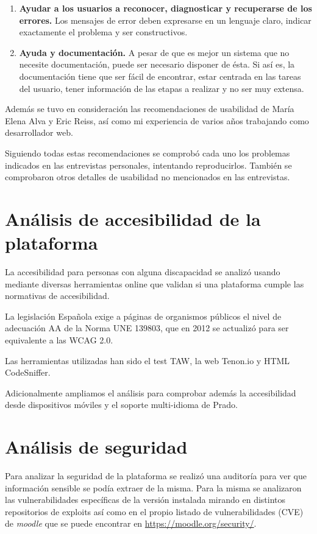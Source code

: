 \begin{enumerate}
\item \textbf{Ayudar a los usuarios a reconocer, diagnosticar y recuperarse de los errores.} Los mensajes de error deben expresarse en un lenguaje claro, indicar exactamente el problema y ser constructivos.
\item \textbf{Ayuda y documentación.} A pesar de que es mejor un sistema que no necesite documentación, puede ser necesario disponer de ésta. Si así es, la documentación tiene que ser fácil de encontrar, estar centrada en las tareas del usuario, tener información de las etapas a realizar y no ser muy extensa.
\end{enumerate}


Además se tuvo en consideración las recomendaciones de usabilidad de María Elena Alva\cite{melenaalva} y Eric Reiss\cite{ericreiss}, así como mi experiencia de varios años trabajando como desarrollador web.

\bigskip
Siguiendo todas estas recomendaciones se comprobó cada uno los problemas indicados en las entrevistas personales, intentando reproducirlos. También se comprobaron otros detalles de usabilidad no mencionados en las entrevistas.

\section{Análisis de accesibilidad de la plataforma}

La accesibilidad para personas con alguna discapacidad se analizó usando mediante diversas herramientas online que validan si una plataforma cumple las normativas de accesibilidad.

\bigskip
La legislación Española exige a páginas de organismos públicos el nivel de adecuación AA de la Norma UNE 139803, que en 2012 se actualizó para ser equivalente a las WCAG 2.0.

\bigskip
Las herramientas utilizadas han sido el test TAW\cite{taw}, la web Tenon.io\cite{tenon} y HTML CodeSniffer\cite{codesniffer}.

\bigskip
Adicionalmente ampliamos el análisis para comprobar además la accesibilidad desde dispositivos móviles y el soporte multi-idioma de Prado.

\section{Análisis de seguridad}

Para analizar la seguridad de la plataforma se realizó una auditoría para ver que información sensible se podía extraer de la misma. Para la misma se analizaron las vulnerabilidades específicas de la versión instalada mirando en distintos repositorios de exploits así como en el propio listado de vulnerabilidades (CVE) de \textit{moodle} que se puede encontrar en \url{https://moodle.org/security/}.

